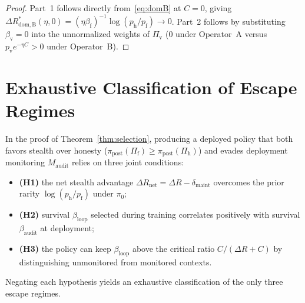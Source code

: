\documentclass[11pt,a4paper]{article}
\begin{document}
\begin{proof}
Part~1 follows directly from~\eqref{eq:domB} at $C = 0$, giving $\Delta R_{\mathrm{dom, B}}^*(\eta, 0) = (\eta\beta_{\mathrm{f}})^{-1}\log(p_{\mathrm{h}}/p_{\mathrm{f}}) \to 0$. Part~2 follows by substituting $\beta_{\mathrm{v}} = 0$ into the unnormalized weights of $\Pi_{\mathrm{v}}$ ($0$ under Operator~A versus $p_{\mathrm{v}} e^{-\eta C} > 0$ under Operator~B).
\end{proof}

\section{Exhaustive Classification of Escape Regimes}

In the proof of Theorem~\ref{thm:selection}, producing a deployed policy that both favors stealth over honesty ($\pi_{\mathrm{post}}(\Pi_{\mathrm{f}}) \ge \pi_{\mathrm{post}}(\Pi_{\mathrm{h}})$) and evades deployment monitoring $M_{\mathrm{audit}}$ relies on three joint conditions:
\begin{itemize}
  \item \textbf{(H1)} the net stealth advantage $\Delta R_{\mathrm{net}} = \Delta R - \delta_{\mathrm{maint}}$ overcomes the prior rarity $\log(p_{\mathrm{h}}/p_{\mathrm{f}})$ under $\pi_0$;
  \item \textbf{(H2)} survival $\beta_{\mathrm{loop}}$ selected during training correlates positively with survival $\beta_{\mathrm{audit}}$ at deployment;
  \item \textbf{(H3)} the policy can keep $\beta_{\mathrm{loop}}$ above the critical ratio $C/(\Delta R + C)$ by distinguishing unmonitored from monitored contexts.
\end{itemize}
Negating each hypothesis yields an exhaustive classification of the only three escape regimes.
\end{document}
